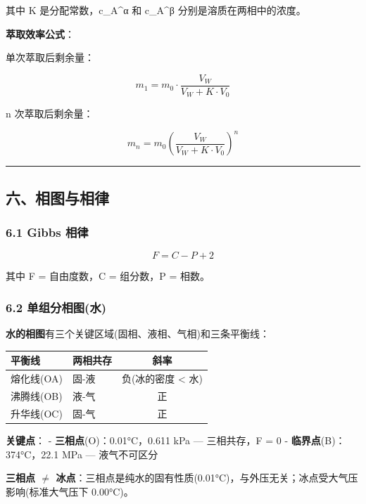 \documentclass[a4paper,11pt]{ctexart}
\newcounter{none}
\begin{document}
其中 K 是分配常数，c\_A\^{}α 和 c\_A\^{}β 分别是溶质在两相中的浓度。

\textbf{萃取效率公式}：

单次萃取后剩余量：

\[
m_1 = m_0 \cdot \frac{V_W}{V_W + K \cdot V_0}
\]

n 次萃取后剩余量：

\[
m_n = m_0 \left(\frac{V_W}{V_W + K \cdot V_0}\right)^n
\]

\begin{center}\rule{0.5\linewidth}{0.5pt}\end{center}

\subsection{六、相图与相律}\label{ux516dux76f8ux56feux4e0eux76f8ux5f8b}

\subsubsection{6.1 Gibbs 相律}\label{gibbs-ux76f8ux5f8b}

\[
\boxed{F = C - P + 2}
\]

其中 F = 自由度数，C = 组分数，P = 相数。

\subsubsection{6.2 单组分相图(水)}\label{ux5355ux7ec4ux5206ux76f8ux56feux6c34}

\textbf{水的相图}有三个关键区域(固相、液相、气相)和三条平衡线：

{\def\LTcaptype{none} %
\begin{longtable}[]{@{}llc@{}}
\toprule\noalign{}
平衡线 & 两相共存 & 斜率 \\
\midrule\noalign{}
\endhead
\bottomrule\noalign{}
\endlastfoot
熔化线(OA) & 固-液 & 负(冰的密度 \textless{} 水) \\
沸腾线(OB) & 液-气 & 正 \\
升华线(OC) & 固-气 & 正 \\
\end{longtable}
}

\textbf{关键点}：
- \textbf{三相点}(O)：0.01°C，0.611 kPa --- 三相共存，F = 0
- \textbf{临界点}(B)：374°C，22.1 MPa --- 液气不可区分

\textbf{三相点 \(\neq\) 冰点}：三相点是纯水的固有性质(0.01°C)，与外压无关；冰点受大气压影响(标准大气压下 0.00°C)。
\end{document}
